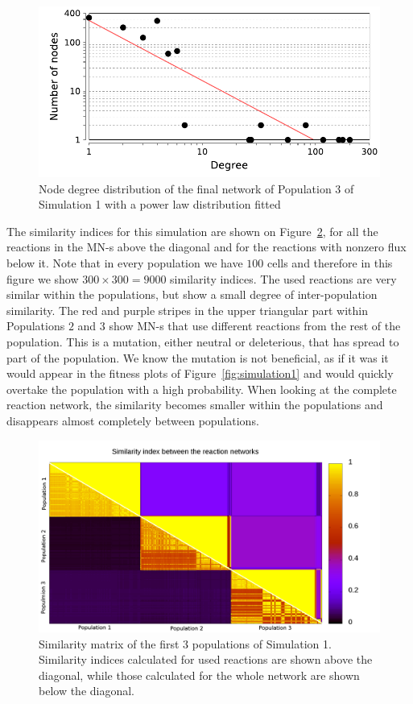 \documentclass[a4paper,12pt]{article}
\begin{document}
\begin{figure}[htpb]
	\centering
	\includegraphics[width=0.8\linewidth]{nodedegreedistro.pdf}
	\caption{Node degree distribution of the final network of Population 3 of Simulation 1 with a power law distribution fitted}
	\label{fig:nodedegreedistro}
\end{figure}

The similarity indices for this simulation are shown on Figure~\ref{fig:simmatrix_firstjob}, for all the reactions in the MN-s above the diagonal and for the reactions with nonzero flux below it. Note that in every population we have $100$ cells and therefore in this figure we show $300 \times 300 = 9000$ similarity indices. The used reactions are very similar within the populations, but show a small degree of inter-population similarity. The red and purple stripes in the upper triangular part within Populations $2$ and $3$ show MN-s that use different reactions from the rest of the population. This is a mutation, either neutral or deleterious, that has spread to part of the population. We know the mutation is not beneficial, as if it was it would appear in the fitness plots of Figure~\ref{fig:simulation1} and would quickly overtake the population with a high probability. When looking at the complete reaction network, the similarity becomes smaller within the populations and disappears almost completely between populations. 

\begin{figure}[htpb]
	\centering
	\includegraphics[width=1\linewidth]{simmatrix_firstjob.png}
	\caption{Similarity matrix of the first 3 populations of Simulation 1. Similarity indices calculated for used reactions are shown above the diagonal, while those calculated for the whole network are shown below the diagonal.}
	\label{fig:simmatrix_firstjob}
\end{figure}
\end{document}
